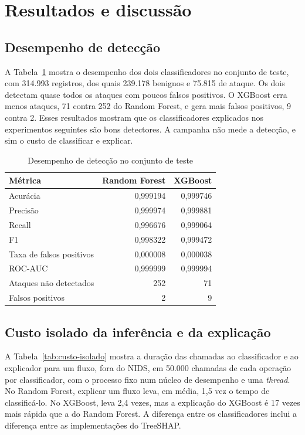 \documentclass[
  article,
  12pt,
  oneside,
  a4paper,
  english,
  brazil
]{abntex2}
\begin{document}
\section{Resultados e discussão}
\label{sec:resultados}

\subsection{Desempenho de detecção}

A Tabela~\ref{tab:deteccao} mostra o desempenho dos dois classificadores no conjunto de teste, com
314.993 registros, dos quais 239.178 benignos e 75.815 de ataque. Os dois detectam quase todos os
ataques com poucos falsos positivos. O XGBoost erra menos ataques, 71 contra 252 do Random Forest, e
gera mais falsos positivos, 9 contra 2. Esses resultados mostram que os classificadores explicados
nos experimentos seguintes são bons detectores. A campanha não mede a detecção, e sim o custo de
classificar e explicar.

\begin{table}[htbp]
  \centering
  \caption{Desempenho de detecção no conjunto de teste}
  \label{tab:deteccao}
  \begin{tabular}{lrr}
    \toprule
    Métrica & Random Forest & XGBoost \\
    \midrule
    Acurácia & 0,999194 & 0,999746 \\
    Precisão & 0,999974 & 0,999881 \\
    Recall & 0,996676 & 0,999064 \\
    F1 & 0,998322 & 0,999472 \\
    Taxa de falsos positivos & 0,000008 & 0,000038 \\
    ROC-AUC & 0,999999 & 0,999994 \\
    Ataques não detectados & 252 & 71 \\
    Falsos positivos & 2 & 9 \\
    \bottomrule
  \end{tabular}
\end{table}

\subsection{Custo isolado da inferência e da explicação}

A Tabela~\ref{tab:custo-isolado} mostra a duração das chamadas ao classificador e ao explicador
para um fluxo, fora do NIDS, em 50.000 chamadas de cada operação por classificador, com o processo
fixo num núcleo de desempenho e uma \emph{thread}. No Random Forest, explicar um fluxo leva, em
média, 1,5 vez o tempo de classificá-lo. No XGBoost, leva 2,4 vezes, mas a explicação do XGBoost é
17 vezes mais rápida que a do Random Forest. A diferença entre os classificadores inclui a diferença
entre as implementações do TreeSHAP.
\end{document}

